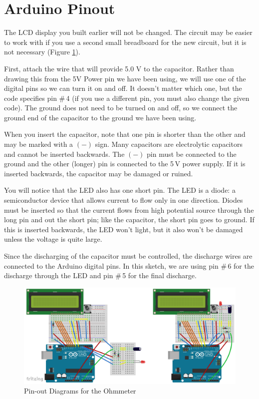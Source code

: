 \documentclass[]{article}
\begin{document}
\section{Arduino Pinout}

The LCD display you built earlier will not be changed.  The circuit may be easier to work with if you use a second small breadboard for the new circuit, but it is not necessary (Figure \ref{pinout}).  

First, attach the wire that will provide 5.0 V to the capacitor.  Rather than drawing this from the 5V Power pin we have been using, we will use one of the digital pins so we can turn it on and off.  It doesn't matter which one, but the code specifies pin \#\,4 (if you use a different pin, you must also change the given code).  The ground does not need to be turned on and off, so we connect the ground end of the capacitor to the ground we have been using.  

When you insert the capacitor, note that one pin is shorter than the other and may be marked with a \((-)\) sign.  Many capacitors are electrolytic capacitors and cannot be inserted backwards.  The \((-)\) pin must be connected to the ground and the other (longer) pin is connected to the 5\,V power supply.  If it is inserted backwards, the capacitor may be damaged or ruined.  %

You will notice that the LED also has one short pin.  The LED is a diode: a semiconductor device that allows current to flow only in one direction.  Diodes must be inserted so that the current flows from high potential source through the long pin and out the short pin; like the capacitor, the short pin goes to ground.  If this is inserted backwards, the LED won't light, but it also won't be damaged unless the voltage is quite large.  

Since the discharging of the capacitor must be controlled, the discharge wires are connected to the Arduino digital pins.  In this sketch, we are using pin \#\,6 for the discharge through the LED and pin \#\,5 for the final discharge.



	\begin{figure}[h]
		\centering
		\includegraphics[width=16cm]{pics/breadboard.png}
		\caption{Pin-out Diagrams for the Ohmmeter}
		\label{pinout}
	\end{figure}
\end{document}
